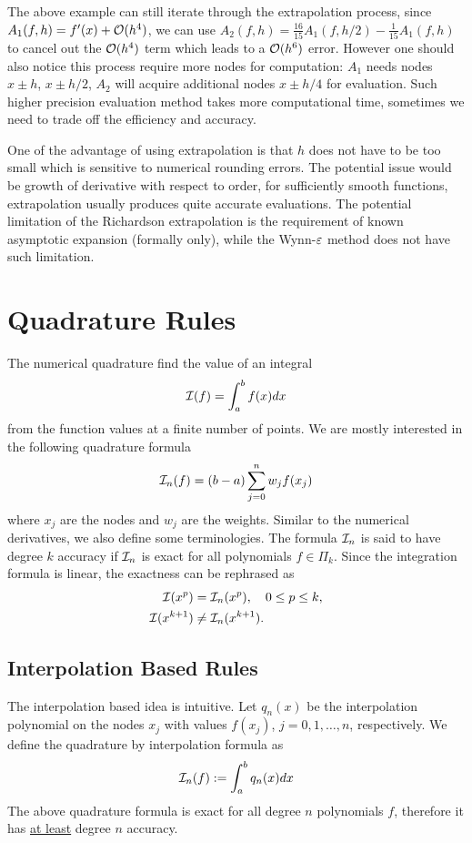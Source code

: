 The above example can still iterate through the extrapolation process, since $A_1(f, h) = f'(x) + \mathcal O(h^4)$, we can use $A_2(f, h) = \frac{16}{15}A_1(f, h/2) -  \frac{1}{15}A_1(f, h)$ to cancel out the $\mathcal O(h^4)$ term which leads to a $\mathcal O(h^6)$ error. However one should also notice this process require more nodes for computation: $A_1$ needs nodes $x\pm h$, $x\pm h/2$, $A_2$ will acquire additional nodes $x\pm h/4$ for evaluation. Such higher precision evaluation method takes more computational time, sometimes we need to trade off the efficiency and accuracy.

\begin{remark}
    One of the advantage of using extrapolation is that $h$ does not have to be too small which is sensitive to numerical rounding errors. The potential issue would be growth of derivative with respect to order, for sufficiently smooth functions, extrapolation usually produces quite accurate evaluations. The potential limitation of the Richardson extrapolation is the requirement of known asymptotic expansion (formally only), while the Wynn-$\varepsilon$ method does not have such limitation. 
\end{remark}


\section{Quadrature Rules}
The numerical quadrature find the value of an integral 
$$\mathcal I(f) = \int_a^b f(x) dx $$
from the function values at a finite number of points. We are mostly interested in the following quadrature formula 
\begin{equation}
    \mathcal I_n(f) = (b - a) \sum_{j=0}^n w_j f(x_j)
\end{equation}
where $x_j$ are the nodes and $w_j$ are the weights. Similar to the numerical derivatives, we also define some terminologies. The formula $\mathcal I_n$ is said to have degree $k$ accuracy if $\mathcal I_n$ is exact for all polynomials $f\in\Pi_k$. Since the integration formula is linear, the exactness can be rephrased as 
\begin{equation}
    \begin{aligned}
        \mathcal I(x^p) &= \mathcal I_n(x^p),\quad 0\le p \le k, \\
        \mathcal I(x^{k+1}) &\neq \mathcal I_n(x^{k+1}) .   
    \end{aligned}
\end{equation}
\subsection{Interpolation Based Rules}
The interpolation based idea is intuitive. Let $q_n(x)$ be the interpolation polynomial on the nodes $x_j$ with values $f(x_j)$, $j=0,1,\dots, n$, respectively. We define the quadrature by interpolation formula as 
\begin{equation}
    \mathcal I_n(f):= \int_a^b q_n(x) dx 
\end{equation}
The above quadrature formula is exact for all degree $n$ polynomials $f$, therefore it has \underline{at least} degree $n$ accuracy. 

